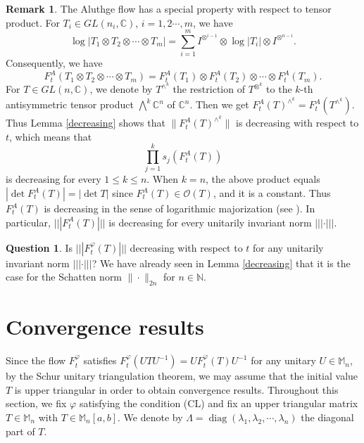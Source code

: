 \documentclass[12pt]{article}
\theoremstyle{definition}
\newtheorem{remark}[theorem]{Remark}
\newtheorem{question}[theorem]{Question}
\numberwithin{equation}{section}
\newcommand{\C}{\mathbb{C}}
\newcommand{\M}{\mathbb{M}}
\newcommand{\N}{\mathbb{N}}
\newcommand{\cO}{\mathcal{O}} \newcommand{\cP}{\mathcal{P}}
\DeclareMathOperator{\diag}{diag}
\begin{document}
\begin{remark} The Aluthge flow has a special property with respect to tensor product. 
For $T_i\in GL(n_i,\C)$, $i=1,2\cdots,m$, we have 
\[\log\left| T_1\otimes T_2\otimes\cdots\otimes T_m \right|
=\sum_{i=1}^m I^{\otimes^{i-1}}\otimes \log|T_i|\otimes I^{\otimes^{n-i}}. \]
Consequently, we have 
\[F^A_t(T_1\otimes T_2\otimes \cdots \otimes T_m)
=F^A_t(T_1)\otimes F^A_t(T_2)\otimes \cdots \otimes F^A_t(T_m).\]
For $T\in GL(n,\C)$, we denote by $T^{\wedge^k}$ the restriction of $T^{\otimes^k}$ 
to the $k$-th antisymmetric tensor product $\bigwedge^k \C^n$ of $\C^n$. 
Then we get $F_t^A(T)^{\wedge^k}=F_t^A(T^{\wedge^k})$. 
Thus Lemma \ref{decreasing} shows that $\|F_t^A(T)^{\wedge^k}\|$ is decreasing with respect to $t$, 
which means that 
\[\prod_{j=1}^ks_j(F^A_t(T))\] 
is decreasing for every $1\leq k\leq n$. 
When $k=n$, the above product equals $|\det F^A_t(T)|=|\det T|$ since $F^A_t(T)\in \cO(T)$, and it is a constant. 
Thus $F^A_t(T)$ is decreasing in the sense of logarithmic majorization (see \cite{AH1994}). 
In particular, $|||F^A_t(T)|||$ is decreasing for every unitarily invariant norm $|||\cdot|||$. 
\end{remark}

\begin{question} Is $|||F^\varphi_t(T)|||$ decreasing with respect to $t$ 
for any unitarily invariant norm $|||\cdot|||$? 
We have already seen in Lemma \ref{decreasing} that it is the case for the Schatten norm $\|\cdot \|_{2n}$ 
for $n\in \N$.  
\end{question}

\section{Convergence results}
Since the flow $F^\varphi_t$ satisfies $F^\varphi_t(UTU^{-1})=UF^\varphi_t(T)U^{-1}$ for any unitary $U\in \M_n$,   
by the Schur unitary triangulation theorem, we may assume 
that the initial value $T$ is upper triangular in order to obtain convergence results.  
Throughout this section, we fix $\varphi$ satisfying the condition (CL) 
and fix an upper triangular matrix $T\in \M_n$ with $T\in \M_n[a,b]$. 
We denote by $\Lambda=\diag(\lambda_1,\lambda_2,\cdots,\lambda_n)$ the diagonal part of $T$. 
\end{document}
